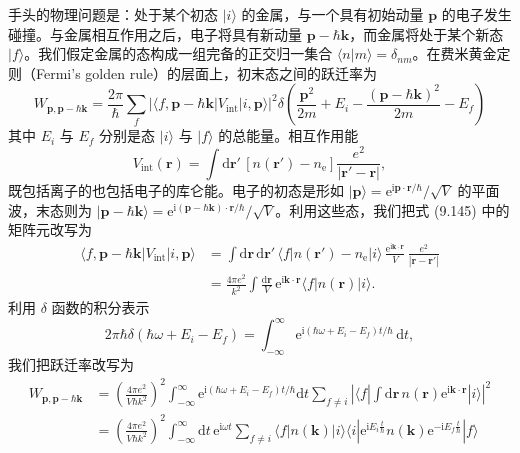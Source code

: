 手头的物理问题是：处于某个初态 $|i\rangle$ 的金属，与一个具有初始动量 $\mathbf{p}$ 的电子发生碰撞。与金属相互作用之后，电子将具有新动量 $\mathbf{p}-\hbar\mathbf{k}$，而金属将处于某个新态 $|f\rangle$。我们假定金属的态构成一组完备的正交归一集合 $\langle n|m\rangle=\delta_{nm}$。在费米黄金定则（Fermi's golden rule）的层面上，初末态之间的跃迁率为
\begin{equation*}
W_{\mathbf{p},\mathbf{p}-\hbar\mathbf{k}}=\frac{2\pi}{\hbar}\sum_{f}\left|\langle f,\mathbf{p}-\hbar\mathbf{k}|V_{\mathrm{int}}|i,\mathbf{p}\rangle\right|^{2}\delta\left(\frac{\mathbf{p}^{2}}{2m}+E_{i}-\frac{(\mathbf{p}-\hbar\mathbf{k})^{2}}{2m}-E_{f}\right)
\end{equation*}
其中 $E_{i}$ 与 $E_{f}$ 分别是态 $|i\rangle$ 与 $|f\rangle$ 的总能量。相互作用能
\begin{equation*}
V_{\mathrm{int}}(\mathbf{r})=\int\mathrm{d}\mathbf{r}'\,\left[n(\mathbf{r}')-n_{\mathrm{e}}\right]\frac{e^{2}}{|\mathbf{r}'-\mathbf{r}|},
\tag{9.145}
\end{equation*}
既包括离子的也包括电子的库仑能。电子的初态是形如 $|\mathbf{p}\rangle=\mathrm{e}^{\mathrm{i}\mathbf{p}\cdot\mathbf{r}/\hbar}/\sqrt{V}$ 的平面波，末态则为 $|\mathbf{p}-\hbar\mathbf{k}\rangle=\mathrm{e}^{\mathrm{i}(\mathbf{p}-\hbar\mathbf{k})\cdot\mathbf{r}/\hbar}/\sqrt{V}$。利用这些态，我们把式 (9.145) 中的矩阵元改写为
\begin{align*}
\langle f,\mathbf{p}-\hbar\mathbf{k}|V_{\mathrm{int}}|i,\mathbf{p}\rangle&=\int\mathrm{d}\mathbf{r}\,\mathrm{d}\mathbf{r}'\,\langle f|n(\mathbf{r}')-n_{\mathrm{e}}|i\rangle\,\frac{\mathrm{e}^{\mathrm{i}\mathbf{k}\cdot\mathbf{r}}}{V}\,\frac{e^{2}}{|\mathbf{r}-\mathbf{r}'|}\\
&=\frac{4\pi e^{2}}{k^{2}}\int\frac{\mathrm{d}\mathbf{r}}{V}\,\mathrm{e}^{\mathrm{i}\mathbf{k}\cdot\mathbf{r}}\langle f|n(\mathbf{r})|i\rangle.
\tag{9.146}
\end{align*}
利用 $\delta$ 函数的积分表示
\begin{equation*}
2\pi\hbar\delta(\hbar\omega+E_{i}-E_{f})=\int_{-\infty}^{\infty}\mathrm{e}^{\mathrm{i}(\hbar\omega+E_{i}-E_{f})t/\hbar}\,\mathrm{d}t,
\end{equation*}
我们把跃迁率改写为
\begin{align*}
W_{\mathbf{p},\mathbf{p}-\hbar\mathbf{k}}&=\left(\frac{4\pi e^{2}}{V\hbar k^{2}}\right)^{2}\int_{-\infty}^{\infty}\mathrm{e}^{\mathrm{i}(\hbar\omega+E_{i}-E_{f})t/\hbar}\mathrm{d}t\sum_{f\neq i}\left|\langle f|\int\mathrm{d}\mathbf{r}\,n(\mathbf{r})\mathrm{e}^{\mathrm{i}\mathbf{k}\cdot\mathbf{r}}|i\rangle\right|^{2}\\
&=\left(\frac{4\pi e^{2}}{V\hbar k^{2}}\right)^{2}\int_{-\infty}^{\infty}\mathrm{d}t\,\mathrm{e}^{\mathrm{i}\omega t}\sum_{f\neq i}\langle f|n(\mathbf{k})|i\rangle\langle i|\mathrm{e}^{\mathrm{i}E_{i}\frac{t}{\hbar}}n(\mathbf{k})\mathrm{e}^{-\mathrm{i}E_{f}\frac{t}{\hbar}}|f\rangle
\tag{9.147}
\end{align*}
